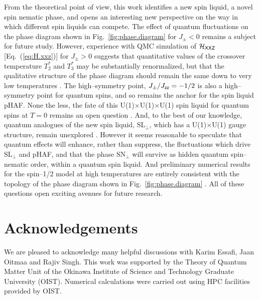 \documentclass[apsrev4-1,prx,superscriptaddress,floatfix,twocolumn,longbibliography]{revtex4-1}
\begin{document}
From the theoretical point of view, this work identifies a new spin liquid, 
a novel spin nematic phase, and opens an interesting new perspective on the way in 
which different spin liquids can compete.  
%
The effect of quantum fluctuations on the 
phase diagram shown in Fig.~\ref{fig:phase.diagram} 
for  $J_\pm < 0$ remains a subject for future study.   
%
However, experience with QMC simulation of 
$\mathcal{H}_{\sf XXZ}$ [Eq.~(\ref{eq:H.xxz})] for $J_\pm > 0$ suggests that 
quantitative values of the crossover temperature $T^*_2$ and $T^*_3$ may 
be substantially renormalized, but that the qualitative structure of the phase 
diagram should remain the same down to very low temperatures 
\cite{banerjee08,kato15,shannon-book-chapter,huang-arXiv.1707.00099}.
%
The high--symmetry point, $J_\pm/J_{\sf zz} = -1/2$ is also a high--symmetry point
for quantum spins, and so remains the anchor for the spin liquid pHAF.
%
None the less, the fate of this U(1)$\times$U(1)$\times$U(1) spin liquid for quantum 
spins at $T=0$ remains an open question \cite{canals98,canals00,tsunetsugu01,Huang2016}.
%
And, to the best of our knowledge, quantum analogues of the new spin liquid, 
$\text{SL}_\perp$, which has a U(1)$\times$U(1) gauge structure, 
remain unexplored \cite{ueda16-PRA93}.  
%
%
However it seems reasonable to speculate that quantum effects will
enhance, rather than suppress, the fluctuations which drive 
$\text{SL}_\perp$ and pHAF, 
and that the phase $\text{SN}_\perp$ will survive as hidden quantum 
spin--nematic order, within a quantum spin liquid.
%
And preliminary numerical results for the spin--1/2 model 
at high temperatures are entirely consistent with the topology of the phase 
diagram shown in Fig.~\ref{fig:phase.diagram} \cite{rajiv-unpublished}.      
%
All of these questions open exciting avenues for future research.

\section*{Acknowledgements}

We are pleased to acknowledge many helpful discussions with Karim Essafi, Jaan Oitmaa 
and Rajiv Singh.  
%
This work was supported by the Theory of Quantum Matter Unit of the Okinawa Institute 
of Science and Technology Graduate University (OIST).   
%
Numerical calculations were carried out using HPC facilities provided by OIST.  
\end{document}

